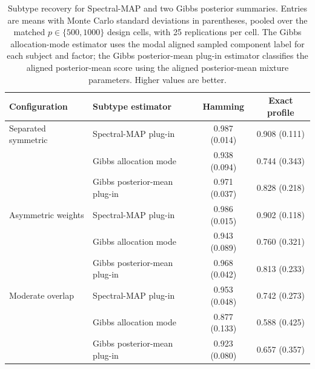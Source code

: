 \begin{table}[t]
\centering
\caption{Subtype recovery for Spectral-MAP and two Gibbs posterior summaries. Entries are means with Monte Carlo standard deviations in parentheses, pooled over the matched $p\in\{500,1000\}$ design cells, with 25 replications per cell. The Gibbs allocation-mode estimator uses the modal aligned sampled component label for each subject and factor; the Gibbs posterior-mean plug-in estimator classifies the aligned posterior-mean score using the aligned posterior-mean mixture parameters. Higher values are better.}
\label{tab:subtype_estimators}
\begin{tabular}{llcc}
\toprule
Configuration & Subtype estimator & Hamming & Exact profile \\
\midrule
Separated symmetric & Spectral-MAP plug-in & 0.987 (0.014) & 0.908 (0.111) \\
 & Gibbs allocation mode & 0.938 (0.094) & 0.744 (0.343) \\
 & Gibbs posterior-mean plug-in & 0.971 (0.037) & 0.828 (0.218) \\
\addlinespace
Asymmetric weights & Spectral-MAP plug-in & 0.986 (0.015) & 0.902 (0.118) \\
 & Gibbs allocation mode & 0.943 (0.089) & 0.760 (0.321) \\
 & Gibbs posterior-mean plug-in & 0.968 (0.042) & 0.813 (0.233) \\
\addlinespace
Moderate overlap & Spectral-MAP plug-in & 0.953 (0.048) & 0.742 (0.273) \\
 & Gibbs allocation mode & 0.877 (0.133) & 0.588 (0.425) \\
 & Gibbs posterior-mean plug-in & 0.923 (0.080) & 0.657 (0.357) \\
\bottomrule
\end{tabular}
\end{table}
